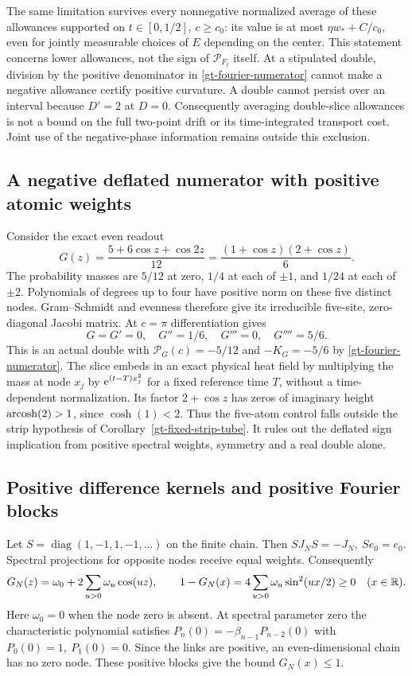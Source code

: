The same limitation survives every nonnegative normalized average of
these allowances supported on \(t\in[0,1/2]\), \(c\ge c_0\): its value
is at most \(\eta w_*+C/c_0\), even for jointly measurable choices of
\(E\) depending on the center. This statement concerns lower allowances,
not the sign of \(\mathcal P_{F_t}\) itself. At a stipulated double,
division by the positive denominator in \eqref{gt-fourier-numerator}
cannot make a negative allowance certify positive curvature. A double
cannot persist over an interval because \(D'=2\) at \(D=0\).
Consequently averaging double-slice allowances is not a bound on the
full two-point drift or its time-integrated transport cost. Joint use
of the negative-phase information remains outside this exclusion.

\subsection{A negative deflated numerator with positive atomic weights}

Consider the exact even readout
\[
 G(z)=\frac{5+6\cos z+\cos 2z}{12}
     =\frac{(1+\cos z)(2+\cos z)}6.
\]
The probability masses are \(5/12\) at zero, \(1/4\) at each
of \(\pm1\), and \(1/24\) at each of \(\pm2\).
Polynomials of degrees up to four have positive norm on these five
distinct nodes. Gram--Schmidt and evenness therefore give its
irreducible five-site, zero-diagonal Jacobi matrix.
At \(c=\pi\) differentiation gives
\[
 G=G'=0,\quad G''=1/6,\quad G'''=0,\quad G''''=5/6 .
\]
This is an actual double with \(\mathcal P_G(c)=-5/12\) and
\(-K_G=-5/6\) by \eqref{gt-fourier-numerator}. The slice embeds
in an exact physical heat field by multiplying the mass at
node \(x_j\) by \(\mathrm e^{(t-T)x_j^2}\) for a fixed reference time \(T\),
without a time-dependent normalization. Its factor \(2+\cos z\)
has zeros of imaginary height \(\operatorname{arcosh}(2)>1\), since \(\cosh(1)<2\).
Thus the five-atom control falls outside the strip hypothesis
of Corollary~\ref{gt-fixed-strip-tube}. It rules out the deflated
sign implication from positive spectral weights, symmetry and
a real double alone.

\subsection{Positive difference kernels and positive Fourier blocks}

Let \(S=\operatorname{diag}(1,-1,1,-1,\ldots)\) on the finite
chain. Then \(SJ_NS=-J_N,\ Se_0=e_0\).
Spectral projections for opposite nodes receive equal weights.
Consequently
\[
 G_N(z)=\omega_0+2\sum_{u>0}\omega_u\cos(uz),\qquad
 1-G_N(x)=4\sum_{u>0}\omega_u\sin^2(ux/2)\ge0
 \quad (x\in\mathbb R).
\]
Here \(\omega_0=0\) when the node zero is absent. At spectral parameter
zero the characteristic polynomial satisfies
\(P_n(0)=-\beta_{n-1}P_{n-2}(0)\) with \(P_0(0)=1,\ P_1(0)=0\).
Since the links are positive, an even-dimensional chain has no zero
node. These positive blocks give the bound \(G_N(x)\le1\).

